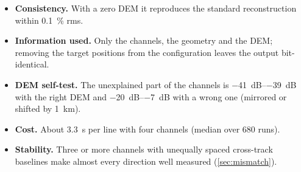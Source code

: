\begin{itemize}
  \item \textbf{Consistency.} With a zero DEM it reproduces the standard reconstruction within \SI{0.1}{\percent} rms.
  \item \textbf{Information used.} Only the channels, the geometry and the DEM; removing the target positions from the
        configuration leaves the output bit-identical.
  \item \textbf{DEM self-test.} The unexplained part of the channels is \SIrange{-41}{-39}{dB} with the right DEM and
        \SIrange{-20}{-7}{dB} with a wrong one (mirrored or shifted by \SI{1}{km}).
  \item \textbf{Cost.} About \SI{3.3}{s} per line with four channels (median over 680 runs).
  \item \textbf{Stability.} Three or more channels with unequally spaced cross-track baselines make almost every direction
        well measured (\cref{sec:mismatch}).
\end{itemize}


